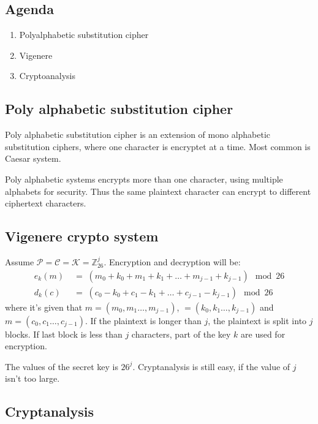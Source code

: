

\subsection{Agenda}
\begin{enumerate}
\item Polyalphabetic substitution cipher
\item Vigenere
\item Cryptoanalysis
\end{enumerate}

\subsection{Poly alphabetic substitution cipher}

Poly alphabetic substitution cipher is an extension of mono alphabetic
substitution ciphers, where one character is encryptet at a time. Most common is Caesar system.

Poly alphabetic systems encrypts more than one character, using
multiple alphabets for security. Thus the same plaintext character can
encrypt to different ciphertext characters.

\subsection{Vigenere crypto system}

Assume $\mathcal{P} = \mathcal{C} = \mathcal{K} =
\mathbb{Z}_{26}^j$. Encryption and decryption will be:
\begin{align*}
  e_{k}(m) \; &= \; (m_0+k_0 +m_1+k_1 + \ldots
  +m_{j-1}+k_{j-1} )  \mod 26\\
  d_{k}(c) \; &= \; (c_0-k_0 +c_1-k_1 + \ldots +c_{j-1}-k_{j-1} ) \mod 26
\end{align*}
where it's given that $m=(m_0,m_1 \ldots,m_{j-1})$, $=(k_0,k_1
\ldots,k_{j-1})$ and $m=(c_0,c_1 \ldots,c_{j-1})$. If the plaintext is
longer than $j$, the plaintext is split into $j$ blocks. If last block
is less than $j$ characters, part of the key $k$ are used for
encryption.

The values of the secret key is $26^j$. Cryptanalysis is still easy,
if the value of $j$ isn't too large.
\subsection{Cryptanalysis}

